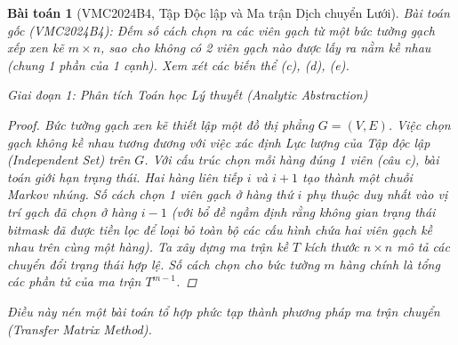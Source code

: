 \documentclass{article}
\newtheorem{baitoan}{Bài toán}
\begin{document}
\begin{baitoan}[VMC2024B4, Tập Độc lập và Ma trận Dịch chuyển Lưới]
 \emph{Bài toán gốc (VMC2024B4):} 
 Đếm số cách chọn ra các viên gạch từ một bức tường gạch xếp xen kẽ $m \times n$, sao cho không có 2 viên gạch nào được lấy ra nằm kề nhau (chung 1 phần của 1 cạnh). Xem xét các biến thể (c), (d), (e).

\vspace{0.5em}\noindent\emph{Giai đoạn 1: Phân tích Toán học Lý thuyết (Analytic Abstraction)}
 
 \begin{proof}
  Bức tường gạch xen kẽ thiết lập một đồ thị phẳng $G=(V, E)$. Việc chọn gạch không kề nhau tương đương với việc xác định Lực lượng của Tập độc lập (Independent Set) trên $G$. Với cấu trúc chọn mỗi hàng đúng 1 viên (câu c), bài toán giới hạn trạng thái. Hai hàng liên tiếp $i$ và $i+1$ tạo thành một chuỗi Markov nhúng. 
 Số cách chọn 1 viên gạch ở hàng thứ $i$ phụ thuộc duy nhất vào vị trí gạch đã chọn ở hàng $i-1$ (với bổ đề ngầm định rằng không gian trạng thái bitmask đã được tiền lọc để loại bỏ toàn bộ các cấu hình chứa hai viên gạch kề nhau trên cùng một hàng). Ta xây dựng ma trận kề $T$ kích thước $n \times n$ mô tả các chuyển đổi trạng thái hợp lệ. Số cách chọn cho bức tường $m$ hàng chính là tổng các phần tử của ma trận $T^{m-1}$.
 \end{proof}
 Điều này nén một bài toán tổ hợp phức tạp thành phương pháp ma trận chuyển (Transfer Matrix Method).


\end{baitoan}
\end{document}
